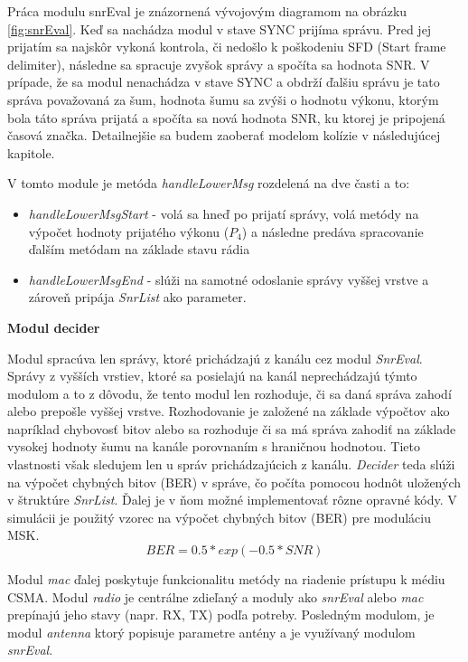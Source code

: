 \documentclass[11pt,twoside,a4paper]{book}
\begin{document}
Práca modulu snrEval je znázornená vývojovým diagramom na obrázku \ref{fig:snrEval}. Keď sa nachádza modul v stave SYNC prijíma správu. Pred jej prijatím sa najskôr vykoná kontrola, či nedošlo k poškodeniu SFD (Start frame delimiter), následne sa spracuje zvyšok správy a spočíta sa hodnota SNR. V prípade, že sa modul nenachádza v stave SYNC a obdrží ďalšiu správu je tato správa považovaná za šum, hodnota šumu sa zvýši o hodnotu výkonu, ktorým bola táto správa prijatá a spočíta sa nová hodnota SNR, ku ktorej je pripojená časová značka. Detailnejšie sa budem zaoberať modelom kolízie v následujúcej kapitole.


V tomto module je metóda \textit{handleLowerMsg} rozdelená na dve časti a to:
\begin{itemize}
 \item \textit{handleLowerMsgStart} - volá sa hneď po prijatí správy, volá metódy na výpočet hodnoty prijatého výkonu ($P_4$) a následne predáva spracovanie ďalším metódam na základe stavu rádia
 \item \textit{handleLowerMsgEnd} - slúži na samotné odoslanie správy vyššej vrstve a zároveň pripája \textit{SnrList} ako parameter.
\end{itemize}


\noindent\textbf{Modul decider}
 
Modul spracúva len správy, ktoré prichádzajú z kanálu cez modul \textit{SnrEval}. Správy z vyšších vrstiev, ktoré sa posielajú na kanál neprechádzajú týmto modulom a to z dôvodu, že tento modul len rozhoduje, či sa daná správa zahodí alebo prepošle vyššej vrstve. Rozhodovanie je založené na základe výpočtov ako napríklad chybovosť bitov alebo sa rozhoduje či sa má správa zahodiť na základe vysokej hodnoty šumu na kanále porovnaním s hraničnou hodnotou. Tieto vlastnosti však sledujem len u správ prichádzajúcich z kanálu. \textit{Decider} teda slúži na výpočet chybných bitov (BER) v správe, čo počíta pomocou hodnôt uložených v štruktúre \textit{SnrList}. Ďalej je v ňom možné implementovať rôzne opravné kódy. V simulácii je použitý vzorec na výpočet chybných bitov (BER) pre moduláciu MSK. 
$$BER = 0.5 * exp(-0.5 * SNR)$$


Modul \textit{mac} ďalej poskytuje funkcionalitu metódy na riadenie prístupu k médiu CSMA. Modul \textit{radio} je centrálne zdieľaný a moduly ako \textit{snrEval} alebo \textit{mac} prepínajú jeho stavy (napr. RX, TX) podľa potreby. Posledným modulom, je modul \textit{antenna} ktorý popisuje parametre antény a je využívaný modulom \textit{snrEval}.
\end{document}
